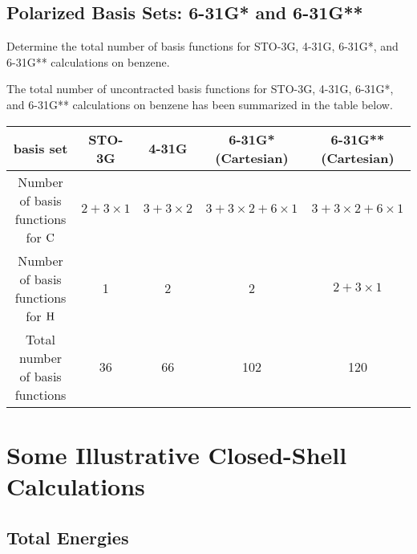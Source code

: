 \documentclass[a4paper]{book}
\newcounter{exercise}[chapter]
\newcounter{solution}[chapter]
\begin{document}
	\subsection{Polarized Basis Sets: 6-31G* and 6-31G**}
	
	\begin{exercise}
	Determine the total number of basis functions for STO-3G, 4-31G, 6-31G*, and 6-31G** calculations on benzene.
	\end{exercise}
	
	\begin{solution}
	
	The total number of uncontracted basis functions for STO-3G, 4-31G, 6-31G*, and 6-31G** calculations on benzene has been summarized in the table below.
	\begin{center}
	\begin{tabular}{ccccc} \hline
	basis set & STO-3G & 4-31G & 6-31G*(Cartesian) & 6-31G**(Cartesian) \\ \hline
	Number of basis functions for $\ce{C}$ & $2+3\times1$ & $3+3\times2$ & $3+3\times2+6\times1$ & $3+3\times2+6\times1$ \\
	Number of basis functions for $\ce{H}$ & 1 & 2 & 2 & $2+3\times1$ \\
	Total number of basis functions & 36 & 66 & 102 & 120 \\ \hline
	\end{tabular}
	\end{center}
	
	\end{solution}
	
	\section{Some Illustrative Closed-Shell Calculations}
	
	\subsection{Total Energies}
	
\end{document}
